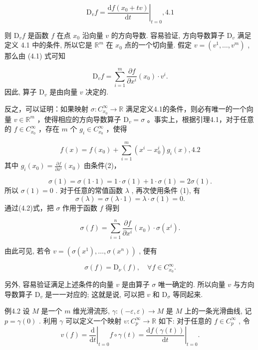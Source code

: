 $$
\mathrm {D} _ {v} f = \left. \frac {\mathrm {d} f \left(x _ {0} + t v\right)}{\mathrm {d} t} \right| _ {t = 0}, %
 {4.1}
$$

则  $\mathrm{D}_v f$  是函数  $f$  在点  $x_0$  沿向量  $v$  的方向导数. 容易验证, 方向导数算子  $\mathrm{D}_v$  满足定义 4.1 中的条件, 所以它是  $\mathbb{R}^m$  在  $x_0$  点的一个切向量. 假定  $v = (v^1, \dots, v^m)$ , 那么由 (4.1) 式可知

$$
\mathrm {D} _ {v} f = \sum_ {i = 1} ^ {m} \frac {\partial f}{\partial x ^ {i}} (x _ {0}) \cdot v ^ {i}.
$$
因此, 算子  $\mathrm{D}_v$  是由向量  $v$  决定的.

反之，可以证明：如果映射  $\sigma : C_{x_0}^{\infty} \to \mathbb{R}$  满足定义4.1的条件，则必有唯一的一个向量  $v \in \mathbb{R}^m$ ，使得相应的方向导数算子  $\mathrm{D}_v = \sigma$ 。事实上，根据引理4.1，对于任意的  $f \in C_{x_0}^{\infty}$ ，存在  $m$  个  $g_i \in C_{x_0}^{\infty}$ ，使得

$$
f (x) = f \left(x _ {0}\right) + \sum_ {i = 1} ^ {m} \left(x ^ {i} - x _ {0} ^ {i}\right) g _ {i} (x), %
 {4.2}
$$
其中  $g_{i}(x_{0}) = \frac{\partial f}{\partial x^{i}} (x_{0})$  由条件(2)，

$$
\sigma (1) = \sigma (1 \cdot 1) = 1 \cdot \sigma (1) + 1 \cdot \sigma (1) = 2 \sigma (1).
$$
所以  $\sigma(1) = 0$ . 对于任意的常值函数  $\lambda$ , 再次使用条件 (1), 有
$$
\sigma (\lambda) = \sigma (\lambda \cdot 1) = \lambda \cdot \sigma (1) = 0.
$$
通过(4.2)式，把  $\sigma$  作用于函数  $f$  得到

$$
\sigma (f) = \sum_ {i = 1} ^ {n} \frac {\partial f}{\partial x ^ {i}} (x _ {0}) \cdot \sigma (x ^ {i}).
$$

由此可见, 若令  $v = (\sigma(x^1), \dots, \sigma(x^n))$ , 便有

$$
\sigma (f) = \mathrm {D} _ {\nu} (f), \quad \forall f \in C _ {x _ {0}} ^ {\infty}.
$$

另外, 容易验证满足上述条件的向量  $v$  是由算子  $\sigma$  唯一确定的. 所以向量  $v$  与方向导数算子  $\mathrm{D}_v$  是一一对应的; 这就是说, 可以把  $v$  和  $\mathrm{D}_{\sigma}$  等同起来.

例4.2 设  $M$  是一个  $m$  维光滑流形,  $\gamma : (-\varepsilon, \varepsilon) \to M$  是  $M$  上的一条光滑曲线, 记  $p = \gamma(0)$ . 利用  $\gamma$  可以定义一个映射  $\upsilon : C_p^\infty \to \mathbb{R}$  如下: 对于任意的  $f \in C_p^\infty$ , 令
$$
v (f) = \left. \frac {\mathrm {d}}{\mathrm {d} t} \right| _ {t = 0} f \circ \gamma (t) = \left. \frac {\mathrm {d} f (\gamma (t))}{\mathrm {d} t} \right| _ {t = 0}.
$$

